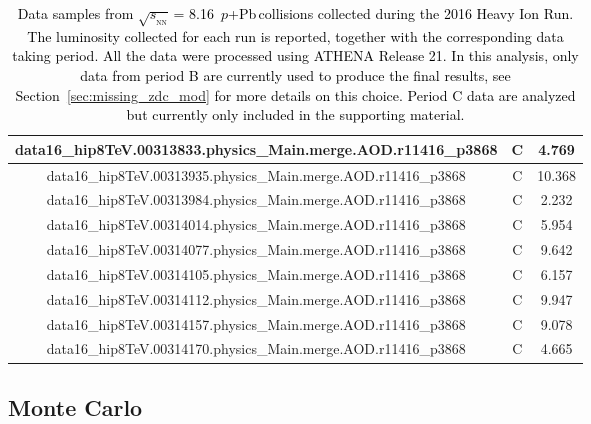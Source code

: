 \documentclass[NOTE, atlasdraft=true, texlive=2020, UKenglish]{atlasdoc}
\newcommand{\SNN}{\ensuremath{\sqrt{s_{_\text{NN}}}}}
\newcommand{\pxPb}{$p$+Pb}
\begin{document}
\begin{table}[ht]
\begin{tabular}{ | c | c | c |}
\hline
data16\_hip8TeV.00313833.physics\_Main.merge.AOD.r11416\_p3868 & C & 4.769 \\ 
\hline
data16\_hip8TeV.00313935.physics\_Main.merge.AOD.r11416\_p3868 & C & 10.368 \\ 
\hline
data16\_hip8TeV.00313984.physics\_Main.merge.AOD.r11416\_p3868 & C & 2.232 \\ 
\hline
data16\_hip8TeV.00314014.physics\_Main.merge.AOD.r11416\_p3868 & C & 5.954 \\ 
\hline
data16\_hip8TeV.00314077.physics\_Main.merge.AOD.r11416\_p3868 & C & 9.642 \\ 
\hline
data16\_hip8TeV.00314105.physics\_Main.merge.AOD.r11416\_p3868 & C & 6.157 \\ 
\hline
data16\_hip8TeV.00314112.physics\_Main.merge.AOD.r11416\_p3868 & C & 9.947 \\ 
\hline
data16\_hip8TeV.00314157.physics\_Main.merge.AOD.r11416\_p3868 & C & 9.078 \\ 
\hline
data16\_hip8TeV.00314170.physics\_Main.merge.AOD.r11416\_p3868 & C & 4.665 \\ 
\hline
\end{tabular}
\caption{\textcolor{black}{Data samples from \SNN\,= 8.16 \TeV\,\pxPb\,collisions collected during the 2016 Heavy Ion Run. The luminosity collected for each run is reported, together with the corresponding data taking period. All the data were processed using ATHENA Release 21. In this analysis, only data from period B are currently used to produce the final results, see Section~\ref{sec:missing_zdc_mod} for more details on this choice. Period C data are analyzed but currently only included in the supporting material.}}
\label{tab:datasets}
\end{table}



\subsection{Monte Carlo}
\label{sec:mc_samples}
\end{document}
